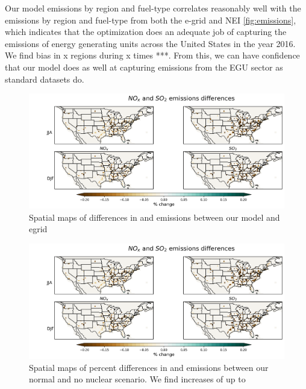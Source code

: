 \documentclass[12]{article}
\begin{document}
Our model emissions by region and fuel-type correlates reasonably well with the emissions by region and fuel-type from both the e-grid and NEI \ref{fig:emissions}, which indicates that the optimization does an adequate job of capturing the emissions of energy generating units across the United States in the year 2016. We find bias in x regions during x times ***. From this, we can have confidence that our model does as well at capturing emissions from the EGU sector as standard datasets do. 
\begin{figure}
    \centering
    \includegraphics[scale=0.4]{ego_nonuclear_project/Figures/summer_nox_so2_emissions.png}
    \caption{Spatial maps of differences in  and  emissions between our model and egrid} 
    \label{fig:emissions_comp}
\end{figure}

\begin{figure}
    \centering
    \includegraphics[scale=0.4]{ego_nonuclear_project/Figures/summer_nox_so2_emissions.png}
    \caption{Spatial maps of percent differences in  and  emissions between our normal and no nuclear scenario. We find increases of up to } 
    \label{fig:emissions_nonuc}
\end{figure}
\end{document}

